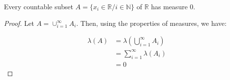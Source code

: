 \begin{leftbar}
\begin{corollary}
	Every countable subset $A=\{x_{i}\in\mathbb{R}/i\in\mathbb{N}\}$ of $\mathbb{R}$ has measure 0.
\end{corollary}
\end{leftbar}

\begin{proof}
	Let $A=\cup_{i=1}^{\infty}A_{i}$. Then, using the properties of measures, we have:
	
	\[
	\begin{aligned}
	\lambda(A) &= \lambda(\bigcup_{i=1}^{\infty}A_{i})\\
	           &= \sum_{i=1}^{\infty}\lambda(A_{i})\\
	           &= 0
	\end{aligned}
	\]
\end{proof}


























%